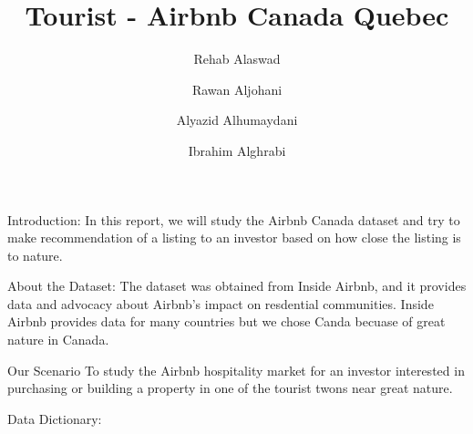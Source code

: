 \documentclass[
  ignorenonframetext,
]{beamer}
\title{Tourist - Airbnb Canada Quebec}
\author{Rehab Alaswad \and Rawan Aljohani \and Alyazid
Alhumaydani \and Ibrahim Alghrabi}
\date{}
\begin{document}
\frame{\titlepage}
\ifdefined\Shaded\renewenvironment{Shaded}{\begin{tcolorbox}[frame hidden, interior hidden, enhanced, borderline west={3pt}{0pt}{shadecolor}, sharp corners, boxrule=0pt, breakable]}{\end{tcolorbox}}\fi

\begin{frame}{Introduction:}
\protect\hypertarget{introduction}{}
In this report, we will study the Airbnb Canada dataset and try to make
recommendation of a listing to an investor based on how close the
listing is to nature.

\begin{block}{About the Dataset:}
\protect\hypertarget{about-the-dataset}{}
The dataset was obtained from Inside Airbnb, and it provides data and
advocacy about Airbnb's impact on resdential communities. Inside Airbnb
provides data for many countries but we chose Canda becuase of great
nature in Canada.
\end{block}

\begin{block}{Our Scenario}
\protect\hypertarget{our-scenario}{}
To study the Airbnb hospitality market for an investor interested in
purchasing or building a property in one of the tourist twons near great
nature.
\end{block}

\begin{block}{Data Dictionary:}
\protect\hypertarget{data-dictionary}{}
\end{block}
\end{frame}
\end{document}
